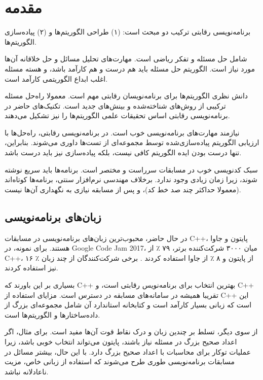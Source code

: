 \chapter{مقدمه}

برنامه‌نویسی رقابتی ترکیب دو مبحث است:
(۱) طراحی الگوریتم‌ها و (۲) پیاده‌سازی الگوریتم‌ها.

 شامل حل مسئله
و تفکر ریاضی است.
مهارت‌های تحلیل مسائل و حل خلاقانه آن‌ها
مورد نیاز است.
الگوریتم حل مسئله
باید هم درست و هم کارآمد باشد،
و هسته مسئله اغلب
ابداع الگوریتمی کارآمد است.

دانش نظری الگوریتم‌ها
برای برنامه‌نویسان رقابتی مهم است.
معمولا راه‌حل مسئله
ترکیبی از روش‌های شناخته‌شده و
بینش‌های جدید است.
تکنیک‌های حاضر در برنامه‌نویسی رقابتی
اساس تحقیقات علمی
الگوریتم‌ها را نیز تشکیل می‌دهند.

 نیازمند مهارت‌های برنامه‌نویسی
خوب است.
در برنامه‌نویسی رقابتی، راه‌حل‌ها
با ارزیابی الگوریتم پیاده‌سازی‌شده
توسط مجموعه‌ای از تست‌ها داوری می‌شوند.
بنابراین، تنها درست بودن ایده الگوریتم
کافی نیست، بلکه پیاده‌سازی نیز
باید درست باشد.

سبک کدنویسی خوب در مسابقات
سرراست و مختصر است.
برنامه‌ها باید سریع نوشته شوند،
زیرا زمان زیادی وجود ندارد.
برخلاف مهندسی نرم‌افزار سنتی،
برنامه‌ها کوتاه‌اند (معمولا حداکثر چند
صد خط کد)، و پس از مسابقه نیازی به
نگهداری آن‌ها نیست.

\section{زبان‌های برنامه‌نویسی}


در حال حاضر، محبوب‌ترین زبان‌های
برنامه‌نویسی در مسابقات C++، پایتون و جاوا هستند.
برای نمونه، در Google Code Jam 2017،
میان ۳۰۰۰ شرکت‌کننده برتر،
۷۹ ٪ از C++،
۱۶ ٪ از پایتون و
۸ ٪ از جاوا استفاده کردند \cite{goo17}.
برخی شرکت‌کنندگان از چند زبان نیز استفاده کردند.

بسیاری بر این باورند که C++ بهترین انتخاب
برای برنامه‌نویس رقابتی است،
و C++ تقریبا همیشه در
سامانه‌های مسابقه در دسترس است.
مزایای استفاده از C++ این است که
زبانی بسیار کارآمد است و
کتابخانه استاندارد آن شامل مجموعه‌ای
بزرگ از داده‌ساختارها و الگوریتم‌ها است.

از سوی دیگر، تسلط بر
چندین زبان و درک
نقاط قوت آن‌ها مفید است.
برای مثال، اگر اعداد صحیح بزرگ در
مسئله نیاز باشند،
پایتون می‌تواند انتخاب خوبی باشد، زیرا
عملیات توکار برای
محاسبات با اعداد صحیح بزرگ دارد.
با این حال، بیشتر مسائل در مسابقات برنامه‌نویسی
طوری طرح می‌شوند که
استفاده از زبانی خاص، مزیت ناعادلانه نباشد.

